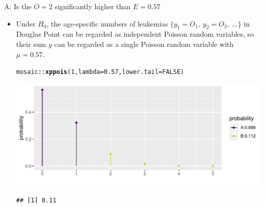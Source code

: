 \documentclass[10pt]{beamer}\usepackage[]{graphicx}\usepackage[]{color}
\makeatletter
\def\maxwidth{ %
  \ifdim\Gin@nat@width>\linewidth
    \linewidth
  \else
    \Gin@nat@width
  \fi
}
\newcommand{\hlnum}[1]{\textcolor[rgb]{0.686,0.059,0.569}{#1}}%
\newcommand{\hlopt}[1]{\textcolor[rgb]{0,0,0}{#1}}%
\newcommand{\hlstd}[1]{\textcolor[rgb]{0.345,0.345,0.345}{#1}}%
\newcommand{\hlkwc}[1]{\textcolor[rgb]{0.333,0.667,0.333}{#1}}%
\newcommand{\hlkwd}[1]{\textcolor[rgb]{0.737,0.353,0.396}{\textbf{#1}}}%
\newenvironment{kframe}{%
 \def\at@end@of@kframe{}%
 \ifinner\ifhmode%
  \def\at@end@of@kframe{\end{minipage}}%
  \begin{minipage}{\columnwidth}%
 \fi\fi%
 \def\FrameCommand##1{\hskip\@totalleftmargin \hskip-\fboxsep
 \colorbox{shadecolor}{##1}\hskip-\fboxsep
     \hskip-\linewidth \hskip-\@totalleftmargin \hskip\columnwidth}%
 \MakeFramed {\advance\hsize-\width
   \@totalleftmargin\z@ \linewidth\hsize
   \@setminipage}}%
 {\par\unskip\endMakeFramed%
 \at@end@of@kframe}
\newenvironment{knitrout}{}{} %
\makeatother
\begin{document}
\begin{frame}[fragile]{A: Is the $O=2$ significantly higher than $E=0.57$}
	\small
	\begin{itemize}
		\setlength\itemsep{1.2em}
		\item {} Under  $H_{0}$, the age-specific numbers of leukemias $\{y_{1}=O_{1},\: y_{2}=O_{2},\: \dots \}$ in Douglas Point can be regarded as independent Poisson random variables, so their sum $y$ can be regarded as a single Poisson random variable with $\mu=0.57$. 
		
\begin{knitrout}\tiny
{}\color{fgcolor}\begin{kframe}
\begin{alltt}
\hlstd{mosaic}\hlopt{::}\hlkwd{xppois}\hlstd{(}\hlnum{1}\hlstd{,} \hlkwc{lambda} \hlstd{=} \hlnum{0.57}\hlstd{,} \hlkwc{lower.tail} \hlstd{=} \hlnum{FALSE}\hlstd{)}
\end{alltt}
\end{kframe}

{\centering \includegraphics[width=\maxwidth]{figure/unnamed-chunk-22-1} 

}


\begin{kframe}\begin{verbatim}
## [1] 0.11
\end{verbatim}
\end{kframe}
\end{knitrout}
		
		
	\end{itemize}
	
\end{frame}
\end{document}
